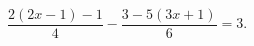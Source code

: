 \begin{ex}[type=equation]
	\begin{condition}
		$\dfrac{2(2x - 1)-1}{4}-\dfrac{3-5(3x + 1)}{6} = 3.$
	\end{condition}
\end{ex}